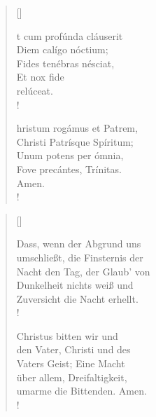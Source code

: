 \newpage

{\setlength{\columnsep}{1cm}
\begin{multicols}{2} 
\begin{verse}[\versewidth]

{\small{t cum profúnda cláuserit\\
Diem calígo nóctium;\\ 
Fides tenébras nésciat,\\
Et nox fide\\
relúceat.\\!

hristum rogámus et Patrem,\\ 
Christi Patrísque Spíritum;\\
Unum potens per ómnia,\\ 
Fove precántes, Trínitas.\\
Amen.\\!}}
\end{verse}

\columnbreak

\begin{verse}[\versewidth]
 
{\small\rm{ Dass, wenn der Abgrund uns\\
umschließt, die Finsternis der\\
Nacht den Tag, der Glaub' von\\
Dunkelheit nichts weiß und\\
Zuversicht die Nacht erhellt.\\!

 Christus bitten wir und\\
den Vater, Christi und des\\
Vaters Geist; Eine Macht\\
über allem, Dreifaltigkeit,\\
umarme die Bittenden. Amen.\\!}}
 
 
\end{verse}

\end{multicols}
}

\medskip

\def\greinitialformat#1{{\fontsize{40}{40}\selectfont #1}}
\gresetfirstlineaboveinitial{\small \textcolor{red}{æstate}}{}
\setaboveinitialseparation{0.72mm}

